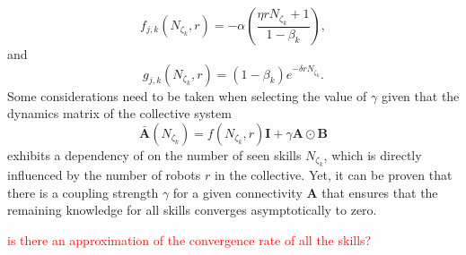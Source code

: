 \begin{equation}\label{eq:f_function_collective}
	f_{j,k}\left(N_{\zeta_k},r\right) = -\alpha \left( \frac{\eta r N_{\zeta_k} + 1}{1 - \beta_k} \right),
\end{equation}
and
\begin{equation}\label{eq:g_function_collective}
	g_{j,k}\left(N_{\zeta_k},r\right) = (1-\beta_k) e^{-\delta r N_{\zeta_k}}.
\end{equation}
Some considerations need to be taken when selecting the value of $\gamma$ given that the dynamics matrix of the collective system
\begin{equation}
	\bar{\bm{A}}\left(N_{\zeta_k}\right) = f\left(N_{\zeta_k},r\right) \bm{I} + \gamma \bm{A} \odot \bm{B} 
\end{equation} 
exhibits a dependency of  on the number of seen skills $N_{\zeta_k}$, which is directly influenced by the number of robots $r$ in the collective. Yet, it can be proven that there is a coupling strength $\gamma$ for a given connectivity $\bm{A}$ that ensures that the remaining knowledge for all skills converges asymptotically to zero.

\TODO \textcolor{red}{is there an approximation of the convergence rate of all the skills?}


